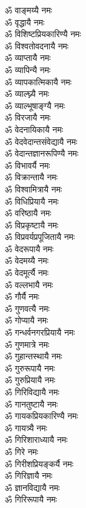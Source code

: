 \begin{flushleft}
\begin{multicols}{2}
ॐ वाङ्मय्यै नमः\\
ॐ वृद्धायै नमः\\
ॐ विशिष्टप्रियकारिण्यै नमः\\
ॐ विश्वतोवदनायै नमः\\
ॐ व्याप्तायै नमः\\
ॐ व्यापिन्यै नमः\\
ॐ व्यापकात्मिकायै नमः\\
ॐ व्याल्घ्न्यै नमः\\
ॐ व्याल्भूषाङ्ग्यै नमः\\
ॐ विरजायै नमः\hfill{}\\
ॐ वेदनायिकायै नमः\\
ॐ वेदवेदान्तसंवेद्यायै नमः\\
ॐ वेदान्तज्ञानरूपिण्यै नमः\\
ॐ विभावर्यै नमः\\
ॐ विक्रान्तायै नमः\\
ॐ विश्वामित्रायै नमः\\
ॐ विधिप्रियायै नमः\\
ॐ वरिष्ठायै नमः\\
ॐ विप्रकृष्टायै नमः\\
ॐ विप्रवर्यप्रपूजितायै नमः\hfill{}\\
ॐ वेदरूपायै नमः\\
ॐ वेदमय्यै नमः\\
ॐ वेदमूर्त्यै नमः\\
ॐ वल्लभायै नमः\\
ॐ गौर्यै नमः\\
ॐ गुणवत्यै नमः\\
ॐ गोप्यायै नमः\\
ॐ गन्धर्वनगरप्रियायै नमः\\
ॐ गुणमात्रे नमः\\
ॐ गुहान्तस्थायै नमः\hfill{}\\
ॐ गुरुरूपायै नमः\\
ॐ गुरुप्रियायै नमः\\
ॐ गिरिविद्यायै नमः\\
ॐ गानतुष्टायै नमः\\
ॐ गायकप्रियकारिण्यै नमः\\
ॐ गायत्र्यै नमः\\
ॐ गिरिशाराध्यायै नमः\\
ॐ गिरे नमः\\
ॐ गिरीशप्रियङ्कर्यै नमः\\
ॐ गिरिज्ञायै नमः\hfill{}\\
ॐ ज्ञानविद्यायै नमः\\
ॐ गिरिरूपायै नमः\\

\end{multicols}
\end{flushleft}
